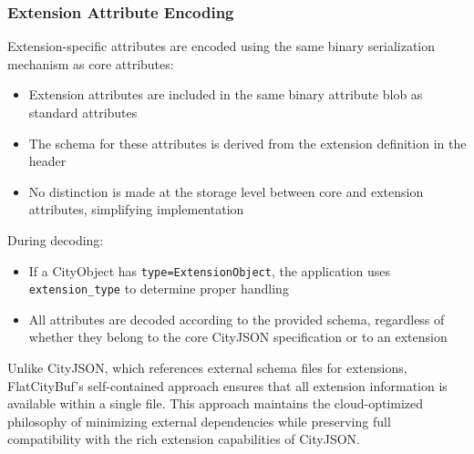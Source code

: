 \subsubsection{Extension Attribute Encoding}
\label{methodology:feature_encoding:extension_mechanism:attributes}

Extension-specific attributes are encoded using the same binary serialization mechanism as core attributes:

\begin{itemize}
  \item Extension attributes are included in the same binary attribute blob as standard attributes
  \item The schema for these attributes is derived from the extension definition in the header
  \item No distinction is made at the storage level between core and extension attributes, simplifying implementation
\end{itemize}

During decoding:
\begin{itemize}
  \item If a CityObject has \texttt{type=ExtensionObject}, the application uses \texttt{extension\_type} to determine proper handling
  \item All attributes are decoded according to the provided schema, regardless of whether they belong to the core CityJSON specification or to an extension
\end{itemize}

Unlike CityJSON, which references external schema files for extensions, FlatCityBuf's self-contained approach ensures that all extension information is available within a single file. This approach maintains the cloud-optimized philosophy of minimizing external dependencies while preserving full compatibility with the rich extension capabilities of CityJSON.
